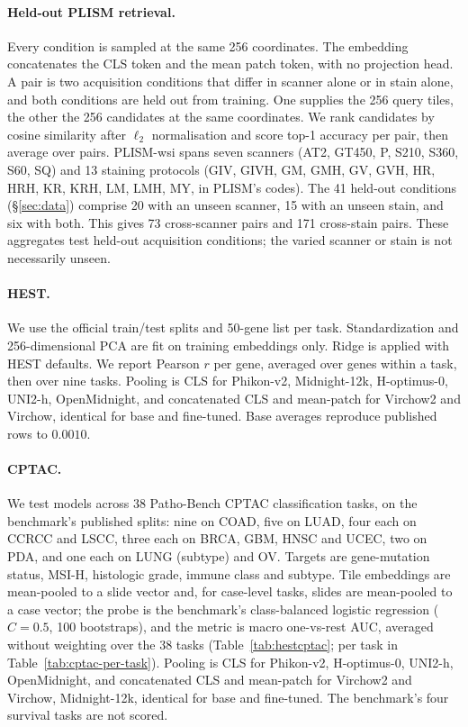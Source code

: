 \paragraph{Held-out PLISM retrieval.}
Every condition is sampled at the same 256 coordinates. The embedding concatenates the CLS token and the mean patch token, with no projection head. A pair is two acquisition conditions that differ in scanner alone or in stain alone, and both conditions are held out from training. One supplies the 256 query tiles, the other the 256 candidates at the same coordinates. We rank candidates by cosine similarity after $\ell_2$ normalisation and score top-1 accuracy per pair, then average over pairs. PLISM-wsi spans seven scanners (AT2, GT450, P, S210, S360, S60, SQ) and 13 staining protocols (GIV, GIVH, GM, GMH, GV, GVH, HR, HRH, KR, KRH, LM, LMH, MY, in PLISM's codes). The 41 held-out conditions (\S\ref{sec:data}) comprise 20 with an unseen scanner, 15 with an unseen stain, and six with both. This gives 73 cross-scanner pairs and 171 cross-stain pairs. These aggregates test held-out acquisition conditions; the varied scanner or stain is not necessarily unseen.

\paragraph{HEST.}
We use the official train/test splits and 50-gene list per task. Standardization and
256-dimensional PCA are fit on training embeddings only. Ridge is applied with HEST defaults. We report Pearson $r$ per
gene, averaged over genes within a task, then over nine tasks. Pooling is CLS for Phikon-v2,
Midnight-12k, H-optimus-0, UNI2-h, OpenMidnight, and concatenated CLS and mean-patch for
Virchow2 and Virchow, identical for base and fine-tuned. Base averages reproduce published rows
to $0.0010$.

\paragraph{CPTAC.}
We test models across 38 Patho-Bench \citep{pathobench} CPTAC classification tasks, on the benchmark's published splits: nine on
COAD, five on LUAD, four each on CCRCC and LSCC, three each on BRCA, GBM, HNSC and UCEC, two on
PDA, and one each on LUNG (subtype) and OV. Targets are gene-mutation status, MSI-H, histologic
grade, immune class and subtype. Tile embeddings are mean-pooled to a slide vector and, for
case-level tasks, slides are mean-pooled to a case vector; the probe is the benchmark's
class-balanced logistic regression ($C=0.5$, 100 bootstraps), and the metric is macro
one-vs-rest AUC, averaged without weighting over the 38 tasks (Table~\ref{tab:hestcptac}; per
task in Table~\ref{tab:cptac-per-task}). Pooling is CLS for Phikon-v2, H-optimus-0, UNI2-h, OpenMidnight, and concatenated CLS and mean-patch for
Virchow2 and Virchow, Midnight-12k, identical for base and fine-tuned. The benchmark's four survival tasks are not scored.

